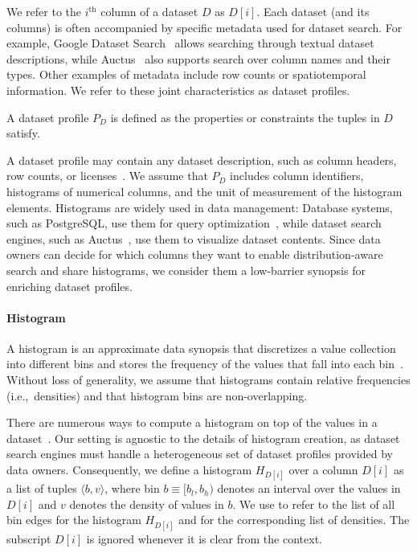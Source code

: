 We refer to the $i^{\text{th}}$ column of a dataset $D$ as $D[i]$.
Each dataset (and its columns) is often accompanied by specific metadata used for dataset search.
For example, Google Dataset Search~\cite{noy_google_2019} allows searching through textual dataset descriptions, while Auctus~\cite{castelo_auctus_2021} also supports search over column names and their types.
Other examples of metadata include row counts or spatiotemporal information.
We refer to these joint characteristics as dataset profiles.

\begin{definition}
    A dataset profile $P_D$ is defined as the properties or constraints the tuples in $D$ satisfy.
\end{definition}

A dataset profile may contain any dataset description, such as column headers, row counts, or licenses~\cite{abedjan_profiling_2015}.
We assume that $P_D$ includes column identifiers, histograms of numerical columns, and the unit of measurement of the histogram elements.
Histograms are widely used in data management:
Database systems, such as PostgreSQL, use them for query optimization~\cite{cormode_synopses_2011}, while dataset search engines, such as Auctus~\cite{castelo_auctus_2021}, use them to visualize dataset contents.
Since data owners can decide for which columns they want to enable distribution-aware search and share histograms, we consider them a low-barrier synopsis for enriching dataset profiles.

\paragraph{Histogram}
A histogram is an approximate data synopsis that discretizes a value collection into different bins and stores the frequency of the values that fall into each bin~\cite{cormode_synopses_2011}.
Without loss of generality, we assume that histograms contain relative frequencies (i.e.,~densities) and that histogram bins are non-overlapping.

There are numerous ways to compute a histogram on top of the values in a dataset~\cite{cormode_synopses_2011}.
Our setting is agnostic to the details of histogram creation, as dataset search engines must handle a heterogeneous set of dataset profiles provided by data owners.
Consequently, we define a histogram $H_{D[i]}$ over a column $D[i]$ as a list of tuples $\langle b, v\rangle$, where bin $b \equiv [b_l, b_h)$ denotes an interval over the values in $D[i]$ and $v$ denotes the density of values in $b$.
We use  to refer to the list of all bin edges for the histogram $H_{D[i]}$ and  for the corresponding list of densities.
The subscript $D[i]$ is ignored whenever it is clear from the context.

